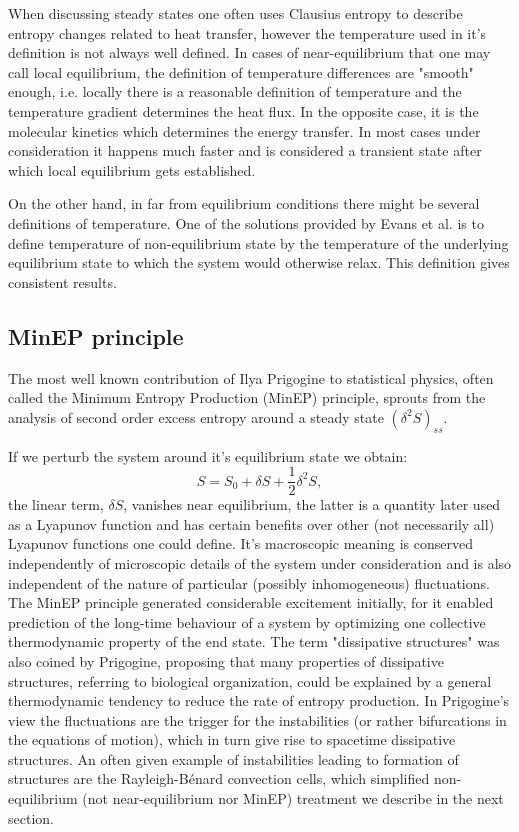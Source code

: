 \documentclass[a4paper,12pt]{article}
\begin{document}
When discussing steady states one often uses Clausius entropy to describe entropy changes related to heat transfer, however the temperature used in it's definition is not always well defined. In cases of near-equilibrium that one may call local equilibrium, the definition of temperature differences are "smooth" enough, i.e. locally there is a reasonable definition of temperature and the temperature gradient determines the heat flux. 
In the opposite case, it is the molecular kinetics which determines the energy transfer. In most cases under consideration it happens much faster and is considered a transient state after which local equilibrium gets established.

On the other hand, in far from equilibrium conditions there might be several definitions of temperature. One of the solutions provided by Evans et al. \cite{Evans:2241458} is to define temperature of non-equilibrium state by the temperature of the underlying equilibrium state to which the system would otherwise relax. This definition gives consistent results.

\subsection{MinEP principle}

The most well known contribution of Ilya Prigogine to statistical physics, often called the Minimum Entropy Production (MinEP) principle, sprouts from the analysis of second order excess entropy around a steady state $ (\delta^2 S)_{ss} $. 

If we perturb the system around it's equilibrium state we obtain:
\begin{equation}
  S=S_0 + \delta S + \frac{1}{2}\delta^2 S,
\end{equation}
the linear term, $\delta S$, vanishes near equilibrium, the latter is a quantity later used as a Lyapunov function and has certain benefits over other (not necessarily all) Lyapunov functions one could define. 
It's macroscopic meaning is conserved independently of microscopic details of the system under consideration and is also independent of the nature of particular (possibly inhomogeneous) fluctuations.
The MinEP principle generated considerable excitement initially, for it enabled prediction of the long-time behaviour of a system by optimizing one collective thermodynamic property of the end state.
The term "dissipative structures" was also coined by Prigogine, proposing that many properties of dissipative structures, referring to biological organization, could be explained by a general thermodynamic tendency to reduce the rate of entropy production. In Prigogine's view the fluctuations are the trigger for the instabilities (or rather bifurcations in the equations of motion), which in turn give rise to spacetime dissipative structures. 
An often given example of instabilities leading to formation of structures are the Rayleigh-Bénard convection cells, which simplified non-equilibrium (not near-equilibrium nor MinEP) treatment we describe in the next section.
\end{document}
